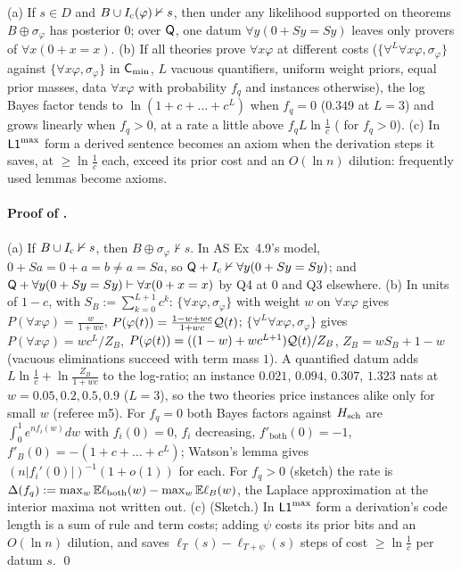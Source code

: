 \begin{proposition}\label{prop:univ:quant}
\textup{(a)} If $s\in D$ and $B\cup I_{\mathrm{c}}(\varphi)\nvdash s$, then under any likelihood supported on theorems $B\oplus\sigma_\varphi$ has posterior $0$; over $\mathsf{Q}$, one datum $\forall y(0+Sy=Sy)$ leaves only provers of $\forall x(0+x=x)$. \textup{(b)} If all theories prove $\forall x\varphi$ at different costs ($\{\forall^L\forall x\varphi,\sigma_\varphi\}$ against $\{\forall x\varphi,\sigma_\varphi\}$ in $\mathsf{C}_{\min}$, $L$ vacuous quantifiers, uniform weight priors, equal prior masses, data $\forall x\varphi$ with probability $f_q$ and instances otherwise), the log Bayes factor tends to $\ln(1+c+\dots+c^L)$ when $f_q=0$ ($0.349$ at $L=3$) and grows linearly when $f_q>0$, at a rate a little above $f_qL\ln\frac1c$ ( for $f_q>0$). \textup{(c)}  In $\mathord{\mathsf{L1}}^{\max}$ form a derived sentence becomes an axiom when the derivation steps it saves, at $\ge\ln\frac1c$ each, exceed its prior cost and an $O(\ln n)$ dilution: frequently used lemmas become axioms.
\end{proposition}

\paragraph{Proof of .} (a) If $B\cup I_{\mathrm{c}}\nvdash s$, then $B\oplus\sigma_\varphi\nvdash s$. In AS Ex~4.9's model, $0+Sa=0+a=b\neq a=Sa$, so $\mathsf{Q}+I_{\mathrm{c}}\nvdash\forall y(0+Sy=Sy)$; and $\mathsf{Q}+\forall y(0+Sy=Sy)\vdash\forall x(0+x=x)$ by Q4 at $0$ and Q3 elsewhere. (b) In units of $1-c$, with $S_B:=\sum_{k=0}^{L+1}c^k$: $\{\forall x\varphi,\sigma_\varphi\}$ with weight $w$ on $\forall x\varphi$ gives $P(\forall x\varphi)=\frac w{1+wc}$, $P(\varphi(t))=\frac{1-w+wc}{1+wc}\mathcal{Q}(t)$; $\{\forall^L\forall x\varphi,\sigma_\varphi\}$ gives $P(\forall x\varphi)=wc^L/Z_B$, $P(\varphi(t))=((1-w)+wc^{L+1})\mathcal{Q}(t)/Z_B$, $Z_B=wS_B+1-w$ (vacuous eliminations succeed with term mass $1$). A quantified datum adds $L\ln\frac1c+\ln\frac{Z_B}{1+wc}$ to the log-ratio; an instance $0.021$, $0.094$, $0.307$, $1.323$ nats at $w=0.05,0.2,0.5,0.9$ ($L=3$), so the two theories price instances alike only for small $w$ (referee m5). For $f_q=0$ both Bayes factors against $H_{\mathrm{sch}}$ are $\int_0^1e^{nf_i(w)}dw$ with $f_i(0)=0$, $f_i$ decreasing, $f'_{\mathrm{both}}(0)=-1$, $f'_B(0)=-(1+c+\dots+c^L)$; Watson's lemma gives $(n\lvert f_i'(0)\rvert)^{-1}(1+o(1))$ for each. For $f_q>0$ (sketch) the rate is $\Delta(f_q):=\max_w\mathbb{E}\ell_{\mathrm{both}}(w)-\max_w\mathbb{E}\ell_B(w)$, the Laplace approximation at the interior maxima not written out. (c) (Sketch.) In $\mathord{\mathsf{L1}}^{\max}$ form a derivation's code length is a sum of rule and term costs; adding $\psi$ costs its prior bits and an $O(\ln n)$ dilution, and saves $\ell_T(s)-\ell_{T+\psi}(s)$ steps of cost $\ge\ln\frac1c$ per datum $s$. \qed

